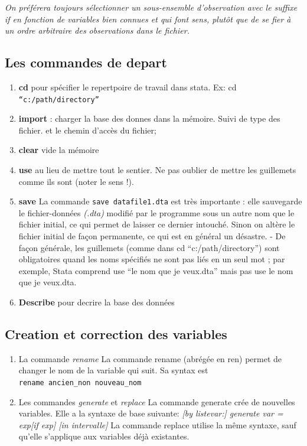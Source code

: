 \documentclass[
]{book}
\providecommand{\tightlist}{%
  \setlength{\itemsep}{0pt}\setlength{\parskip}{0pt}}
\begin{document}
\emph{On préférera toujours sélectionner un sous-ensemble d'observation avec le suffixe if en fonction de variables bien connues et qui font sens, plutôt que de se fier à un ordre arbitraire des observations dans le fichier. }

\hypertarget{les-commandes-de-depart}{%
\subsection{Les commandes de depart}\label{les-commandes-de-depart}}

\begin{enumerate}
\def\labelenumi{(\arabic{enumi})}
\setcounter{enumi}{-1}
\tightlist
\item
  \textbf{cd} pour spécifier le repertpoire de travail dans stata. Ex: cd \texttt{“c:/path/directory”}
\item
  \textbf{import} : charger la base des donnes dans la mémoire. Suivi de type des fichier. et le chemin d'accès du fichier;
\item
  \textbf{clear} vide la mémoire
\item
  \textbf{use} au lieu de mettre tout le sentier. Ne pas oublier de mettre les guillemets comme ils sont (noter le sens !).
\item
  \textbf{save} La commande \texttt{save\ datafile1.dta} est très importante : elle sauvegarde le fichier-données \emph{(.dta)} modifié par le programme sous un autre nom que le fichier initial, ce qui permet de laisser ce dernier intouché. Sinon on altère le fichier initial de façon permanente, ce qui est en général un désastre. - De façon générale, les guillemets (comme dans cd ``c:/path/directory'') sont obligatoires quand les noms spécifiés ne sont pas liés en un seul mot ; par exemple, Stata comprend use ``le nom que je veux.dta'' mais pas use le nom que je veux.dta.
\item
  \textbf{Describe} pour decrire la base des données
\end{enumerate}

\hypertarget{creation-et-correction-des-variables}{%
\subsection{Creation et correction des variables}\label{creation-et-correction-des-variables}}

\begin{enumerate}
\def\labelenumi{(\arabic{enumi})}
\item
  La commande \emph{rename}
  La commande rename (abrégée
  en ren) permet de changer le nom de la variable qui suit. Sa syntax est
  \texttt{rename\ ancien\_non\ nouveau\_nom}
\item
  Les commandes \emph{generate} et \emph{replace}
  La commande generate crée de nouvelles variables. Elle a la syntaxe de base suivante:
  \emph{{[}by listevar:{]} generate var = exp{[}if exp{]} {[}in intervalle{]}}
  La commande replace utilise la même syntaxe, sauf qu'elle s'applique aux variables déjà existantes.
\end{enumerate}
\end{document}
